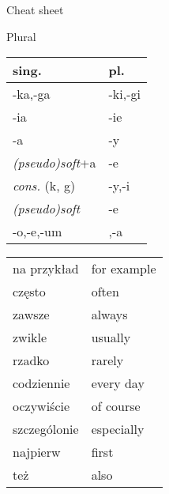 \documentclass[10pt,twoside]{../filofax2}
\begin{document}
\begin{ffpage}{\huge Cheat sheet}
\end{ffpage}

\begin{ffpage}{\huge Plural}
	\begin{tabular}{|m{3cm}|m{2cm}|}
		\hline
		sing.&pl.\\
		\hline
		-ka,-ga&-ki,-gi\\
		-ia&-ie\\
		-a&-y\\\hline
		{\sl (pseudo)soft}+a&-e\\
		{\sl cons.} (k, g)&-y,-i\\\hline
		{\sl (pseudo)soft}&-e\\
		-o,-e,-um&,-a\\\hline
	\end{tabular}

\end{ffpage}


\begin{ffpage}{\Huge}
	\begin{tabular}{m{3cm} m{3cm}}
		na przyk\l{}ad& for example\\
		cz\k{e}sto&often\\
		zawsze&always\\
		zwikle&usually\\
		rzadko&rarely\\
		codziennie&every day\\
		oczywi\'scie&of course\\
		szczeg\'olonie&especially\\
		najpierw&first\\
		te\.z&also		
	\end{tabular}
	
	
\end{ffpage}
\end{document}
